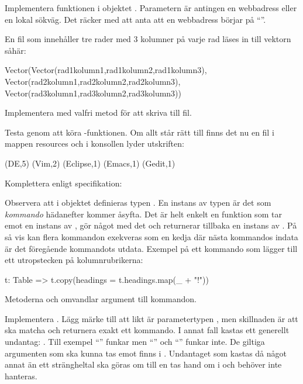 \Subtask Implementera funktionen  i objektet . Parametern  är antingen en webbadress eller en lokal sökväg. Det räcker med att anta att en webbadress börjar på ``''.

En fil som innehåller tre rader med 3 kolumner på varje rad läses in till vektorn såhär:
\begin{CodeSmall}[language=, ]
Vector(Vector(rad1kolumn1,rad1kolumn2,rad1kolumn3),
       Vector(rad2kolumn1,rad2kolumn2,rad2kolumn3),
       Vector(rad3kolumn1,rad3kolumn2,rad3kolumn3))
\end{CodeSmall}

\Subtask Implementera  med valfri metod för att skriva till fil.

\Subtask Testa  genom att köra -funktionen. Om allt står rätt till finns det nu en fil  i mappen resources och i konsollen lyder utskriften:
\begin{REPLnonum}
(DE,5)
(Vim,2)
(Eclipse,1)
(Emacs,1)
(Gedit,1)

\end{REPLnonum}



\Task Komplettera  enligt specifikation:


Observera att i objektet  definieras typen . En instans av typen  är det som \textit{kommando} hädanefter kommer åsyfta. Det är helt enkelt en funktion som tar emot en instans av , gör något med det och returnerar tillbaka en instans av . På så vis kan flera kommandon exekveras som en kedja där nästa kommandos indata är det föregående kommandots utdata. Exempel på ett kommando som lägger till ett utropstecken på kolumnrubrikerna:
\begin{CodeSmall}[language=, ]
t: Table => t.copy(headings = t.headings.map(_ + "!"))
\end{CodeSmall}
Metoderna  och  omvandlar argument till kommandon.

\Subtask Implementera . Lägg märke till att likt  är parametertypen , men skillnaden är att  ska matcha och returnera exakt ett kommando. I annat fall kastas ett generellt undantag: . Till exempel ``'' funkar men ``'' och ``'' funkar inte. De giltiga argumenten som ska kunna tas emot finns i . Undantaget som kastas då något annat än ett strängheltal ska göras om till en  tas hand om i  och behöver inte hanteras.

